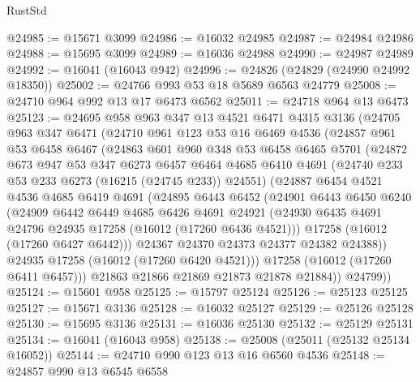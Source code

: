 \begin{lexlean}{RustStd}
\begin{coremodule}
@24985 := @15671 @3099
@24986 := @16032 @24985
@24987 := @24984 @24986
@24988 := @15695 @3099
@24989 := @16036 @24988
@24990 := @24987 @24989
@24992 := @16041 (@16043 @942)
@24996 := @24826 (@24829 (@24990 @24992 @18350))
@25002 := @24766 @993 @53 @18 @5689 @6563 @24779
@25008 := @24710 @964 @992 @13 @17 @6473 @6562
@25011 := @24718 @964 @13 @6473
@25123 := @24695
    @958
    @963
    @347
    @13
    @4521
    @6471
    @4315
    @3136
    (@24705
      @963
      @347
      @6471
      (@24710
        @961
        @123
        @53
        @16
        @6469
        @4536
        (@24857
          @961
          @53
          @6458
          @6467
          (@24863
            @601
            @960
            @348
            @53
            @6458
            @6465
            @5701
            (@24872
              @673
              @947
              @53
              @347
              @6273
              @6457
              @6464
              @4685
              @6410
              @4691
              (@24740 @233 @53 @233 @6273 (@16215 (@24745 @233)) @24551)
              (@24887
                @6454
                @4521
                @4536
                @4685
                @6419
                @4691
                (@24895
                  @6443
                  @6452
                  (@24901
                    @6443
                    @6450
                    @6240
                    (@24909
                      @6442
                      @6449
                      @4685
                      @6426
                      @4691
                      @24921
                      (@24930 @6435 @4691 @24796 @24935 @17258 (@16012 (@17260 @6436 @4521)))
                      @17258
                      (@16012 (@17260 @6427 @6442)))
                    @24367
                    @24370
                    @24373
                    @24377
                    @24382
                    @24388))
                @24935
                @17258
                (@16012 (@17260 @6420 @4521)))
              @17258
              (@16012 (@17260 @6411 @6457)))
            @21863
            @21866
            @21869
            @21873
            @21878
            @21884))
        @24799))
@25124 := @15601 @958
@25125 := @15797 @25124
@25126 := @25123 @25125
@25127 := @15671 @3136
@25128 := @16032 @25127
@25129 := @25126 @25128
@25130 := @15695 @3136
@25131 := @16036 @25130
@25132 := @25129 @25131
@25134 := @16041 (@16043 @958)
@25138 := @25008 (@25011 (@25132 @25134 @16052))
@25144 := @24710 @990 @123 @13 @16 @6560 @4536
@25148 := @24857 @990 @13 @6545 @6558

\end{coremodule}
\end{lexlean}
